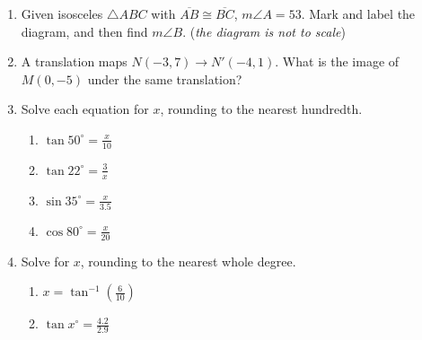 \documentclass[12pt, twoside]{article}
\begin{document}
\begin{enumerate}
\item Given isosceles $\triangle ABC$ with $\overline{AB} \cong \overline{BC}$, $m\angle A = 53$. Mark and label the diagram, and then find $m\angle B$. \hfill (\emph{the diagram is not to scale})
  \begin{flushright}
  \end{flushright}

\item A translation maps $N(-3, 7) \rightarrow N'(-4,1)$. What is the image of $M(0,-5)$ under the same translation?

\newpage
\item Solve each equation for $x$, rounding to the nearest hundredth.
  \begin{multicols}{2}
    \begin{enumerate}
    \item $\displaystyle \tan 50^\circ = \frac{x}{10}$ \vspace{5cm}
    \item $\displaystyle \tan 22^\circ = \frac{3}{x}$
    \item $\displaystyle \sin 35^\circ  = \frac{x}{3.5}$ \vspace{5cm}
    \item $\displaystyle \cos 80^\circ = \frac{x}{20}$
    \end{enumerate}
  \end{multicols}
  \vspace{6cm}

\item Solve for $x$, rounding to the nearest whole degree.
  \begin{multicols}{2}
    \begin{enumerate}
    \item $\displaystyle x = \tan^{-1} (\frac{6}{10})$ \vspace{4cm}
    \item $\displaystyle \tan x^\circ = \frac{4.2}{2.9}$ \vspace{4cm}
    \end{enumerate}
  \end{multicols}


\end{enumerate}
\end{document}

